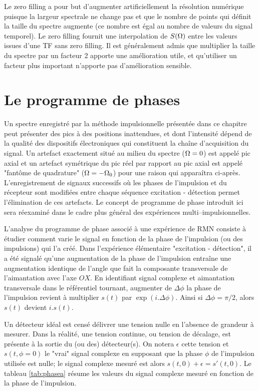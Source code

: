 Le zero filling a pour but d'augmenter artificiellement la résolution numérique
puisque la largeur spectrale ne change pas et que le nombre de points qui définit
la taille du spectre augmente (ce nombre est égal au nombre de valeurs du signal temporel).
Le zero filling fournit une interpolation de $S(\Omega)$ entre les valeurs issues d'une TF
sans zero filling.
Il est généralement admis que multiplier la taille du spectre par un facteur 2 apporte 
une amélioration utile, et qu'utiliser un facteur plus important n'apporte
pas d'amélioration sensible.

\section{Le programme de phases}
\label{sec:progphaseft}

Un spectre enregistré par la méthode impulsionnelle présentée dans ce chapitre peut présenter
des pics à des positions inattendues, et dont l'intensité
dépend de la qualité des dispositifs électroniques qui constituent
la chaîne d'acquisition du signal.
Un artefact exactement situé au milieu du 
spectre ($\Omega = 0$) est appelé pic axial et un artefact symétrique du pic réel par rapport au pic 
axial est appelé "fantôme de quadrature" ($\Omega = - \Omega_0$)
pour une raison qui apparaîtra ci-après.
L'enregistrement de signaux successifs où les 
phases de l'impulsion et du récepteur sont modifiées entre chaque séquence excitation - 
détection permet l'élimination de ces artefacts. 
Le concept de programme de phase introduit ici sera 
réexaminé dans le cadre plus général des expériences multi--impulsionnelles.

L'analyse du programme de phase associé à une expérience de RMN
consiste à étudier comment varie le signal en 
fonction de la phase de l'impulsion (ou des impulsions) qui l'a créé. 
Dans l'expérience élémentaire "excitation - détection", 
il a été signalé qu'une augmentation de la phase de l'impulsion entraîne une 
augmentation identique de l'angle que fait la composante transversale
de l'aimantation avec l'axe $OX$.
En identifiant signal complexe et aimantation transversale dans le référentiel tournant,
augmenter de $\Delta \phi$ la phase de l'impulsion revient à 
multiplier $s(t)$ par $\exp(i.\Delta\phi)$. 
Ainsi si $\Delta\phi = \pi/2$, alors $s(t)$ devient $i.s(t)$. 

Un détecteur idéal est censé délivrer une tension nulle en l'absence de grandeur à 
mesurer. 
Dans la réalité, une tension continue, ou tension de décalage, 
est présente à la sortie du (ou des) détecteur(s). 
On notera $\epsilon$ cette tension et $s(t,\phi = 0)$ 
le "vrai" signal complexe en supposant 
que la phase $\phi$ de l'impulsion utilisée est nulle; 
le signal complexe mesuré est alors  $s(t, 0) + \epsilon = s'(t, 0)$. 
Le tableau \ref{tab:phasea} résume les valeurs du signal complexe 
mesuré en fonction de la phase de l'impulsion.

